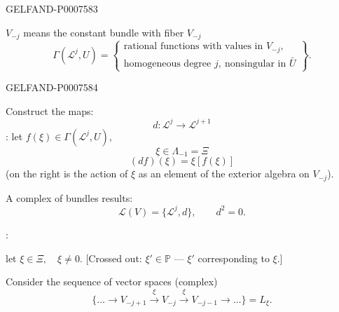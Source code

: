 \begin{GelfandAdjacentEvidence}{GELFAND-P000758}{3}


\(V_{-j}\) means the constant bundle with fiber \(V_{-j}\)
\[
\Gamma(\mathcal L^j,U)=
\left\{\begin{gathered}
\text{rational functions with values in }V_{-j},\\
\text{homogeneous degree }j,\ \text{nonsingular in }\bar U
\end{gathered}\right\}.
\]
\end{GelfandAdjacentEvidence}
\begin{GelfandAdjacentEvidence}{GELFAND-P000758}{4}


Construct the maps:
\[
d:\mathcal L^j\longrightarrow\mathcal L^{j+1}
\]
: let
\(f(\xi)\in\Gamma(\mathcal L^j,U)\),
\[
\xi\in\Lambda_{-1}=\Xi
\]
\[
(df)(\xi)=\xi[f(\xi)]
\]
(on the right is the action of \(\xi\) as an element of the exterior algebra on \(V_{-j}\)).

A complex of bundles results:
\[
\mathcal L(V)=\{\mathcal L^j,d\},\qquad d^2=0.
\]

:

let \(\xi\in\Xi,\quad\xi\ne0\).
[Crossed out: \(\xi'\in\mathbb P\) --- \(\xi'\) corresponding to \(\xi\).]
\end{GelfandAdjacentEvidence}


Consider the sequence of vector spaces (complex)
\[
\{\ldots\longrightarrow V_{-j+1}
\xrightarrow{\xi}V_{-j}\xrightarrow{\xi}V_{-j-1}
\longrightarrow\ldots\}=L_\xi.
\]


